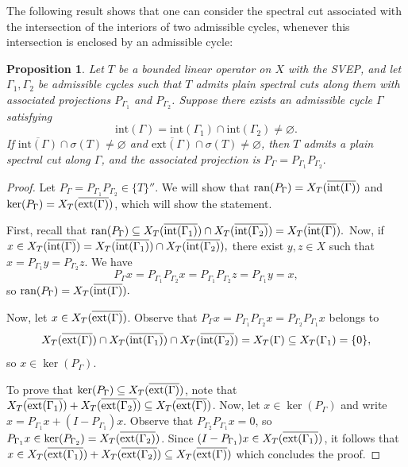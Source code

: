 \documentclass[11pt]{amsart}
\newtheorem{proposition}[theorem]{Proposition}
\theoremstyle{definition}
\theoremstyle{remark}
\numberwithin{equation}{section}
\newcommand{\ran}{\textnormal{ran}}
\newcommand{\biconm}[1]{{\{#1\}''}}
\newcommand{\inte}{\textnormal{int}}
\newcommand{\exte}{\textnormal{ext}}
\begin{document}
The following result shows that one can consider the spectral cut associated with the intersection of the interiors of two admissible cycles, whenever this intersection is enclosed by an admissible cycle:

\begin{proposition}\label{proposicion interseccion curvas}
Let $T$ be a bounded linear operator on $X$ with the SVEP, and let $\Gamma_1,\Gamma_2$ be admissible cycles such that $T$ admits plain spectral cuts along them with associated projections $P_{\Gamma_1}$ and $P_{\Gamma_2}$. Suppose there exists an admissible cycle $\Gamma$ satisfying
$$
\mathrm{int}(\Gamma)=\mathrm{int}(\Gamma_1)\cap \mathrm{int}(\Gamma_2)\neq\varnothing.
$$
If $\overline{\mathrm{int}(\Gamma)}\cap\sigma(T)\neq\varnothing$ and $\overline{\mathrm{ext}(\Gamma)}\cap\sigma(T)\neq\varnothing$, then $T$ admits a plain spectral cut along $\Gamma$, and the associated projection is $P_\Gamma=P_{\Gamma_1}P_{\Gamma_2}.$
\end{proposition}



\begin{proof}
Let $P_\Gamma=P_{\Gamma_1}P_{\Gamma_2}\in \biconm{T}.$ We will show that $\ran(P_\Gamma) = X_T(\overline{\inte(\Gamma)})$ and $\ker(P_\Gamma) = X_T(\overline{\exte(\Gamma)})$, which will show the statement.

First, recall that $\ran(P_\Gamma)\subseteq  X_T(\overline{\inte(\Gamma_1)})\cap X_T(\overline{\inte(\Gamma_2)}) = X_T(\overline{\inte(\Gamma)}).$ Now, if $x\in X_T(\overline{\inte(\Gamma)})=X_T(\overline{\inte(\Gamma_1)})\cap X_T(\overline{\inte(\Gamma_2)}),$  there exist $y,z\in X$ such that $x=P_{\Gamma_1}y=P_{\Gamma_2}z.$ We have
$$
P_\Gamma x = P_{\Gamma_1}P_{\Gamma_2}x = P_{\Gamma_1}P_{\Gamma_2}z = P_{\Gamma_1}y = x,
$$
so $\ran(P_\Gamma) =X_T(\overline{\inte(\Gamma)}).$

Now, let $x\in X_T(\overline{\exte(\Gamma)})$. Observe that $P_\Gamma x = P_{\Gamma_1}P_{\Gamma_2}x = P_{\Gamma_2}P_{\Gamma_1}x$ belongs to
$$X_T(\overline{\exte(\Gamma)})\cap X_T(\overline{\inte(\Gamma_1)})\cap X_T(\overline{\inte(\Gamma_2)}) = X_T(\Gamma) \subseteq  X_T(\Gamma_1) = \{0\}, $$ so $x\in \ker(P_\Gamma)$.

To prove that $\ker(P_\Gamma) \subseteq   X_T(\overline{\exte(\Gamma)})$,  note that $X_T(\overline{\exte(\Gamma_1)})+X_T(\overline{\exte(\Gamma_2)})\subseteq   X_T(\overline{\exte(\Gamma)})$. Now, let $x\in \ker(P_\Gamma)$ and write $x=P_{\Gamma_1}x+(I-P_{\Gamma_1})x$. Observe that $P_{\Gamma_2}P_{\Gamma_1} x =0$, so $P_{\Gamma_1}x \in \ker(P_{\Gamma_2}) = X_T(\overline{\exte(\Gamma_2)})$. Since $(I-P_{\Gamma_1})x \in X_T(\overline{\exte(\Gamma_1)})$, it follows that $x\in X_T(\overline{\exte(\Gamma_1)})+X_T(\overline{\exte(\Gamma_2)})\subseteq   X_T(\overline{\exte(\Gamma)})$ which concludes the proof.
\end{proof}
\end{document}
